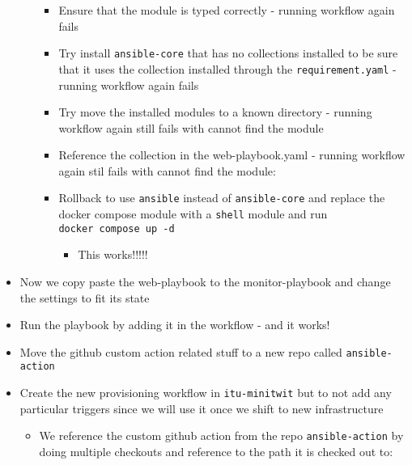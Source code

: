 \begin{itemize}
\begin{itemize}
        \begin{itemize}
            \item Ensure that the module is typed correctly - running workflow again fails
            \item Try install \texttt{ansible-core} that has no collections installed to be sure that it uses the collection installed through the \texttt{requirement.yaml} - running workflow again fails
            \item Try move the installed modules to a known directory - running workflow again still fails with cannot find the module
            \item Reference the collection in the web-playbook.yaml - running workflow again stil fails with cannot find the module:


            \item Rollback to use \texttt{ansible} instead of \texttt{ansible-core} and replace the docker compose module with a \texttt{shell} module and run \texttt{docker\ compose\ up\ -d}

            \begin{itemize}
                \item This works!!!!!
            \end{itemize}
        \end{itemize}
    \end{itemize}
    \item Now we copy paste the web-playbook to the monitor-playbook and change the settings to fit its state
    \item Run the playbook by adding it in the workflow - and it works!
    \item Move the github custom action related stuff to a new repo called \texttt{ansible-action}
    \item Create the new provisioning workflow in \texttt{itu-minitwit} but to not add any particular triggers since we will use it once we shift to new infrastructure

    \begin{itemize}
        \item We reference the custom github action from the repo \texttt{ansible-action} by doing multiple checkouts and reference to the path it is checked out to:


\end{itemize}
\end{itemize}
